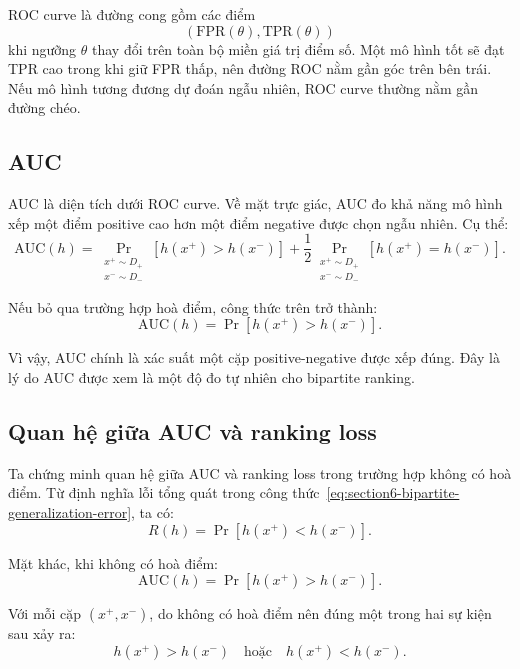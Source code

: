 ROC curve là đường cong gồm các điểm
\[
    \left(
        \mathrm{FPR}(\theta),
        \mathrm{TPR}(\theta)
    \right)
\]
khi ngưỡng \(\theta\) thay đổi trên toàn bộ miền giá trị điểm số. Một mô hình tốt sẽ đạt TPR cao trong khi giữ FPR thấp, nên đường ROC nằm gần góc trên bên trái. Nếu mô hình tương đương dự đoán ngẫu nhiên, ROC curve thường nằm gần đường chéo.

\subsection{AUC}

AUC là diện tích dưới ROC curve. Về mặt trực giác, AUC đo khả năng mô hình xếp một điểm positive cao hơn một điểm negative được chọn ngẫu nhiên. Cụ thể:
\begin{equation}
    \mathrm{AUC}(h)
    =
    \Pr_{\substack{x^{+}\sim D_{+}\\x^{-}\sim D_{-}}}
    \left[
        h(x^{+}) > h(x^{-})
    \right]
    +
    \frac{1}{2}
    \Pr_{\substack{x^{+}\sim D_{+}\\x^{-}\sim D_{-}}}
    \left[
        h(x^{+}) = h(x^{-})
    \right].
    \label{eq:section6-auc-pairwise}
\end{equation}

Nếu bỏ qua trường hợp hoà điểm, công thức trên trở thành:
\[
    \mathrm{AUC}(h)
    =
    \Pr
    \left[
        h(x^{+}) > h(x^{-})
    \right].
\]

Vì vậy, AUC chính là xác suất một cặp positive-negative được xếp đúng. Đây là lý do AUC được xem là một độ đo tự nhiên cho bipartite ranking.

\subsection{Quan hệ giữa AUC và ranking loss}

Ta chứng minh quan hệ giữa AUC và ranking loss trong trường hợp không có hoà điểm. Từ định nghĩa lỗi tổng quát trong công thức~\eqref{eq:section6-bipartite-generalization-error}, ta có:
\[
    R(h)
    =
    \Pr
    \left[
        h(x^{+}) < h(x^{-})
    \right].
\]

Mặt khác, khi không có hoà điểm:
\[
    \mathrm{AUC}(h)
    =
    \Pr
    \left[
        h(x^{+}) > h(x^{-})
    \right].
\]

Với mỗi cặp \((x^{+},x^{-})\), do không có hoà điểm nên đúng một trong hai sự kiện sau xảy ra:
\[
    h(x^{+}) > h(x^{-})
    \quad
    \text{hoặc}
    \quad
    h(x^{+}) < h(x^{-}).
\]

